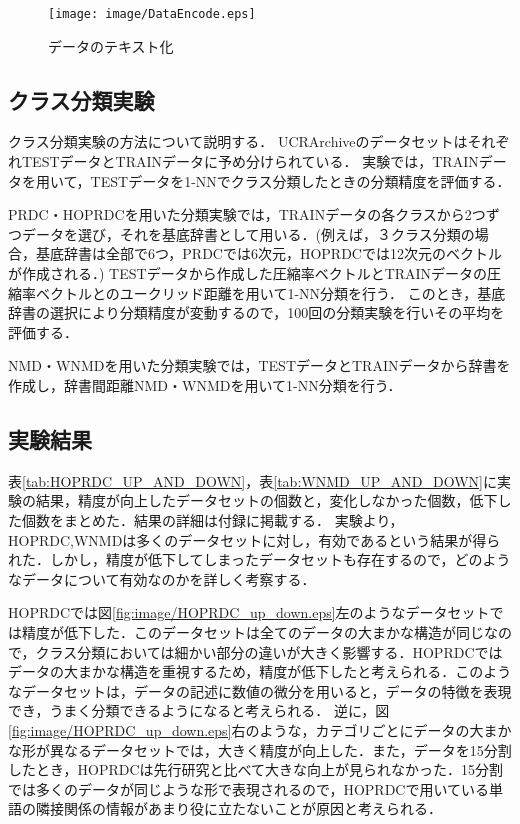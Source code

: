 \begin{figure}[tb]
\begin{center}
\texttt{[image: image/DataEncode.eps]}
\end{center}
\caption{データのテキスト化}
\label{fig:DataEncode.eps}
\end{figure}

\subsection{クラス分類実験} %
\label{sub:クラス分類実験}
クラス分類実験の方法について説明する．
UCRArchiveのデータセットはそれぞれTESTデータとTRAINデータに予め分けられている．
実験では，TRAINデータを用いて，TESTデータを1-NNでクラス分類したときの分類精度を評価する．

PRDC・HOPRDCを用いた分類実験では，TRAINデータの各クラスから2つずつデータを選び，それを基底辞書として用いる．(例えば，３クラス分類の場合，基底辞書は全部で6つ，PRDCでは6次元，HOPRDCでは12次元のベクトルが作成される．)
TESTデータから作成した圧縮率ベクトルとTRAINデータの圧縮率ベクトルとのユークリッド距離を用いて1-NN分類を行う．
このとき，基底辞書の選択により分類精度が変動するので，100回の分類実験を行いその平均を評価する．

NMD・WNMDを用いた分類実験では，TESTデータとTRAINデータから辞書を作成し，辞書間距離NMD・WNMDを用いて1-NN分類を行う．
\subsection{実験結果} %
\label{sub:実験結果}
表\ref{tab:HOPRDC_UP_AND_DOWN}，表\ref{tab:WNMD_UP_AND_DOWN}に実験の結果，精度が向上したデータセットの個数と，変化しなかった個数，低下した個数をまとめた．結果の詳細は付録に掲載する．
実験より，HOPRDC,WNMDは多くのデータセットに対し，有効であるという結果が得られた．しかし，精度が低下してしまったデータセットも存在するので，どのようなデータについて有効なのかを詳しく考察する．

HOPRDCでは図\ref{fig:image/HOPRDC_up_down.eps}左のようなデータセットでは精度が低下した．このデータセットは全てのデータの大まかな構造が同じなので，クラス分類においては細かい部分の違いが大きく影響する．HOPRDCではデータの大まかな構造を重視するため，精度が低下したと考えられる．このようなデータセットは，データの記述に数値の微分を用いると，データの特徴を表現でき，うまく分類できるようになると考えられる．
逆に，図\ref{fig:image/HOPRDC_up_down.eps}右のような，カテゴリごとにデータの大まかな形が異なるデータセットでは，大きく精度が向上した．また，データを15分割したとき，HOPRDCは先行研究と比べて大きな向上が見られなかった．15分割では多くのデータが同じような形で表現されるので，HOPRDCで用いている単語の隣接関係の情報があまり役に立たないことが原因と考えられる．

